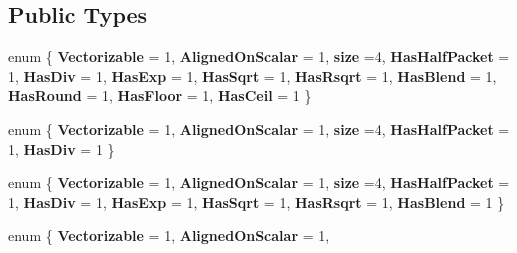 \subsection*{Public Types}
\begin{DoxyCompactItemize}
\item 
\mbox{\label{struct_eigen_1_1internal_1_1packet__traits_3_01double_01_4_af1a39f06bc985317e7c2d12a6f7f11c2}} 
enum \{ \newline
{\bfseries Vectorizable} = 1, 
{\bfseries Aligned\+On\+Scalar} = 1, 
{\bfseries size} =4, 
{\bfseries Has\+Half\+Packet} = 1, 
\newline
{\bfseries Has\+Div} = 1, 
{\bfseries Has\+Exp} = 1, 
{\bfseries Has\+Sqrt} = 1, 
{\bfseries Has\+Rsqrt} = 1, 
\newline
{\bfseries Has\+Blend} = 1, 
{\bfseries Has\+Round} = 1, 
{\bfseries Has\+Floor} = 1, 
{\bfseries Has\+Ceil} = 1
 \}
\item 
\mbox{\label{struct_eigen_1_1internal_1_1packet__traits_3_01double_01_4_a9bcb41eacf11cbee695590c013d08aad}} 
enum \{ \newline
{\bfseries Vectorizable} = 1, 
{\bfseries Aligned\+On\+Scalar} = 1, 
{\bfseries size} =4, 
{\bfseries Has\+Half\+Packet} = 1, 
\newline
{\bfseries Has\+Div} = 1
 \}
\item 
\mbox{\label{struct_eigen_1_1internal_1_1packet__traits_3_01double_01_4_aaa97d7a4590dbb7b3efb5c8e0364cfa8}} 
enum \{ \newline
{\bfseries Vectorizable} = 1, 
{\bfseries Aligned\+On\+Scalar} = 1, 
{\bfseries size} =4, 
{\bfseries Has\+Half\+Packet} = 1, 
\newline
{\bfseries Has\+Div} = 1, 
{\bfseries Has\+Exp} = 1, 
{\bfseries Has\+Sqrt} = 1, 
{\bfseries Has\+Rsqrt} = 1, 
\newline
{\bfseries Has\+Blend} = 1
 \}
\item 
\mbox{\label{struct_eigen_1_1internal_1_1packet__traits_3_01double_01_4_ad751ece7014b74eeab82cf05d5ba186f}} 
enum \{ \newline
{\bfseries Vectorizable} = 1, 
{\bfseries Aligned\+On\+Scalar} = 1, 

\end{DoxyCompactItemize}
